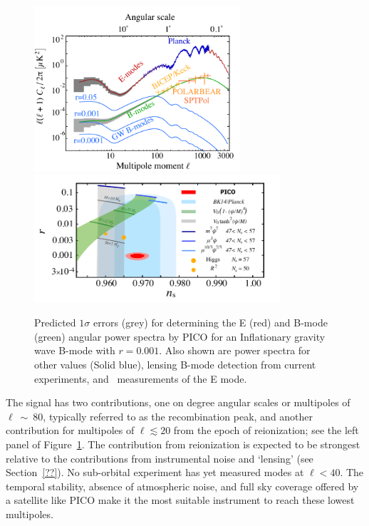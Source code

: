 \documentclass[PICOReport.tex]{subfiles}
\begin{document}
\begin{figure}[!htb]
\centering
\hspace{-0.15in}
\includegraphics[width=3in]{images/cmb_powspec_PICOv2.pdf}
\hspace{-0.15in}
\includegraphics[width=3.6in]{images/nsrlabeledrp001_PICOv1.pdf}
\caption{Predicted $1\sigma$ errors (grey) for determining the E (red) and B-mode (green) angular power 
spectra by PICO for an Inflationary gravity wave B-mode with $r=0.001$.   Also shown are power spectra 
for other values (Solid blue), lensing B-mode detection from current experiments, 
and \planck~measurements of the E mode.  
 }
\label{fig:clbb}
\end{figure}

The signal has two contributions, one on degree angular scales or multipoles of $\ell~\sim~80$, 
typically referred to as the recombination peak, and another contribution for multipoles of $\ell\lesssim 20$ 
from the epoch of reionization; see the left panel of Figure~\ref{fig:clbb}. The contribution from reionization 
is expected 
to be strongest relative to the contributions from instrumental noise and `lensing' (see Section~\ref{??}).  
No sub-orbital experiment has yet measured modes at $\ell<40$. The temporal stability, absence of 
atmospheric noise, and full sky coverage offered by a satellite like PICO make it
the most suitable instrument to reach these lowest multipoles.  
\end{document}
